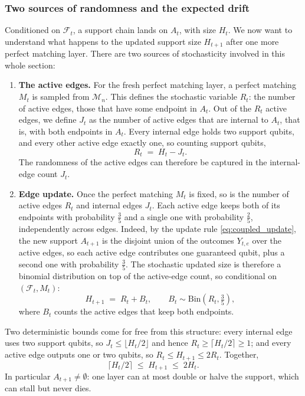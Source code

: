 \documentclass[
    aps,
    superscriptaddress,
    onecolumn,
    10pt,
    prx,
    nofootinbib
]{revtex4-2}
\theoremstyle{namedstatement}
\theoremstyle{plain}
\begin{document}
\subsubsection{Two sources of randomness and the expected drift}
Conditioned on $\mathcal{F}_t$, a support chain lands on $A_t$, with size $H_t$. We now want to understand what happens to the updated support size $H_{t+1}$ after one more perfect matching layer. There are two sources of stochasticity involved in this whole section:
\begin{enumerate}
   \item \textbf{The active edges.} For the fresh perfect matching layer, a perfect matching $M_t$ is sampled from $\mathcal{M}_n$. This defines the stochastic variable $R_t$: the number of active edges, those that have some endpoint in $A_t$. Out of the $R_t$ active edges, we define $J_t$ as the number of active edges that are internal to $A_t$, that is, with both endpoints in $A_t$. Every internal edge holds two support qubits, and every other active edge exactly one, so counting support qubits,
    \begin{equation}
    \label{eq:active-edges}
        R_t \;=\; H_t - J_t .
    \end{equation}
    The randomness of the active edges can therefore be captured in the internal-edge count $J_t$.
    \item \textbf{Edge update.} Once the perfect matching $M_t$ is fixed, so is the number of active edges $R_t$ and internal edges $J_t$. Each active edge keeps both of its endpoints with probability $\tfrac{3}{5}$ and a single one with probability $\tfrac{2}{5}$, independently across edges. Indeed, by the update rule \cref{eq:coupled_update}, the new support $A_{t+1}$ is the disjoint union of the outcomes $Y_{t,e}$ over the active edges, so each active edge contributes one guaranteed qubit, plus a second one with probability $\tfrac{3}{5}$. The stochastic updated size is therefore a binomial distribution on top of the active-edge count, so conditional on $(\mathcal{F}_t, M_t)$:
    \begin{equation}
    \label{eq:one-step}
        H_{t+1} \;=\; R_t + B_t, \qquad B_t\sim\mathrm{Bin}\!\left(R_t , \tfrac{3}{5}\right),
    \end{equation}
    where $B_t$ counts the active edges that keep both
endpoints.
\end{enumerate}
Two deterministic bounds come for free from this structure: every internal edge uses two support qubits, so $J_t \leq \lfloor H_t/2 \rfloor$ and hence $R_t \geq \lceil H_t/2 \rceil \geq 1$; and every active edge outputs one or two qubits, so $R_t \leq H_{t+1} \leq 2R_t$. Together,
\begin{equation}
\label{eq:sandwich}
    \lceil H_t / 2 \rceil \;\leq\; H_{t+1} \;\leq\; 2 H_t .
\end{equation}
In particular $A_{t+1} \neq \emptyset$: one layer can at most double or halve the support, which can stall but never dies.
\end{document}
